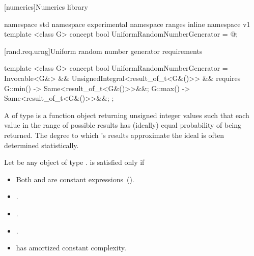 [numerics]{Numerics library}


\begin{codeblock}
namespace std { namespace experimental { namespace ranges { inline namespace v1 {
  template <class G>
  concept bool UniformRandomNumberGenerator = @\seebelow@;
}}}}
\end{codeblock}


[rand.req.urng]{Uniform random number generator requirements}%
%

\begin{codeblock}
template <class G>
concept bool UniformRandomNumberGenerator =
  Invocable<G&> &&
  UnsignedIntegral<result_of_t<G&()>> &&
  requires {
    { G::min() } -> Same<result_of_t<G&()>>&&;
    { G::max() } -> Same<result_of_t<G&()>>&&;
  };
\end{codeblock}

\pnum
A 
 of type 
is a function object
returning unsigned integer values
such that each value
in the range of possible results
has (ideally) equal probability
of being returned.
\enternote
 The degree to which 's results
 approximate the ideal
 is often determined statistically.
\exitnote

\pnum
Let  be any object of type .
 is satisfied only if

\begin{itemize}
\item Both  and  are constant expressions~().
\item {}.
\item {}.
\item {}.
\item {} has amortized constant complexity.
\end{itemize}
